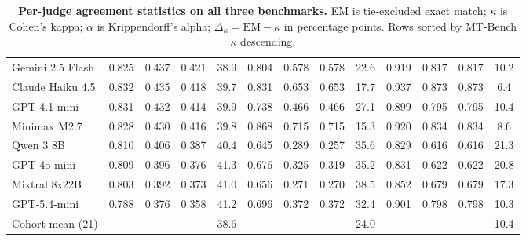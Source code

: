\begin{table}[!t]
\begin{tabular}{lcccccccccccc}
Gemini 2.5 Flash  & 0.825 & 0.437 & 0.421 & 38.9 & 0.804 & 0.578 & 0.578 & 22.6 & 0.919 & 0.817 & 0.817 & 10.2 \\
Claude Haiku 4.5  & 0.832 & 0.435 & 0.418 & 39.7 & 0.831 & 0.653 & 0.653 & 17.7 & 0.937 & 0.873 & 0.873 &  6.4 \\
GPT-4.1-mini      & 0.831 & 0.432 & 0.414 & 39.9 & 0.738 & 0.466 & 0.466 & 27.1 & 0.899 & 0.795 & 0.795 & 10.4 \\
Minimax M2.7      & 0.828 & 0.430 & 0.416 & 39.8 & 0.868 & 0.715 & 0.715 & 15.3 & 0.920 & 0.834 & 0.834 &  8.6 \\
Qwen 3 8B         & 0.810 & 0.406 & 0.387 & 40.4 & 0.645 & 0.289 & 0.257 & 35.6 & 0.829 & 0.616 & 0.616 & 21.3 \\
GPT-4o-mini       & 0.809 & 0.396 & 0.376 & 41.3 & 0.676 & 0.325 & 0.319 & 35.2 & 0.831 & 0.622 & 0.622 & 20.8 \\
Mixtral 8x22B     & 0.803 & 0.392 & 0.373 & 41.0 & 0.656 & 0.271 & 0.270 & 38.5 & 0.852 & 0.679 & 0.679 & 17.3 \\
GPT-5.4-mini      & 0.788 & 0.376 & 0.358 & 41.2 & 0.696 & 0.372 & 0.372 & 32.4 & 0.901 & 0.798 & 0.798 & 10.3 \\
\midrule
Cohort mean (21)  &       &       &       & 38.6 &       &       &       & 24.0 &       &       &       & 10.4 \\
\bottomrule
\end{tabular}
\caption{\textbf{Per-judge agreement statistics on all three benchmarks.}
EM is tie-excluded exact match; $\kappa$ is Cohen's kappa;
$\alpha$ is Krippendorff's alpha; $\Delta_\kappa = \text{EM} - \kappa$
in percentage points. Rows sorted by MT-Bench $\kappa$ descending.}
\label{tab:appendix-agreement}
\end{table}


